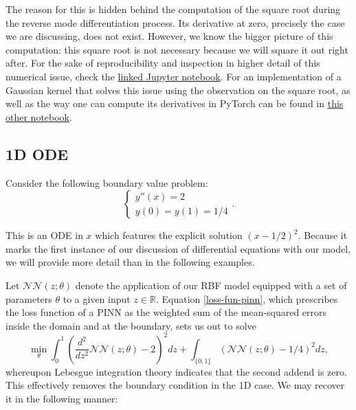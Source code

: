 \documentclass[12pt]{report} %
\begin{document}
The reason for this is hidden behind the computation of the square root during the reverse
mode differentiation process. Its derivative at zero, precisely the case we
are discussing, does not exist.
However, we know the bigger picture of this computation: this square root is not
necessary because we will square it out right after. For the sake of reproducibility
and inspection in higher detail of this numerical issue, check the
\href{https://github.com/heqro/tfm-experiments/blob/main/introductory_notebooks/differentials_computation/differentials_rbf_NANs.ipynb}{linked
  Jupyter notebook}. For an implementation of a Gaussian kernel that solves this issue
using the observation on the square root, as well
as the way one can compute its derivatives in PyTorch can be found in
\href{https://github.com/heqro/tfm-experiments/blob/main/introductory_notebooks/differentials_computation/differentials_rbf_NANs_fixed.ipynb}
{this other notebook}.

\subsection{1D ODE}

Consider the following boundary value problem:
\[ \left\{\begin{array}{l}
    y'' (x) = 2 \\
    y (0) = y (1) = 1 / 4
  \end{array}\right. . \]

This is an ODE in $x$ which features the explicit solution $(x - 1 / 2)^2$.
Because it marks the first instance of our discussion of differential equations
with our model, we will provide more detail than in the following examples.

Let $\mathcal{N}\mathcal{N} (z ; \theta)$ denote the application of our RBF
model equipped with a set of parameters $\theta$ to a given input $z \in
  \mathbb{R}$. Equation \eqref{loss-fun-pinn}, which prescribes the loss function
of a PINN as the weighted sum of the mean-squared errors inside the domain and at
the boundary, sets us out to solve
\begin{equation}
  \min_{\theta}  \int_0^1 \left( \frac{d^2}{d z^2} \mathcal{N}\mathcal{N} (z ;
    \theta) - 2 \right)^2 d z + \int_{\{ 0, 1 \}} (\mathcal{N}\mathcal{N} (z ;
  \theta) - 1 / 4)^2 d z, \label{eqn-lebesgue-ode-1}
\end{equation}
whereupon Lebesgue integration theory indicates that the second addend is zero.
This effectively removes the boundary condition in the 1D case. We may
recover it in the following manner:
\end{document}
